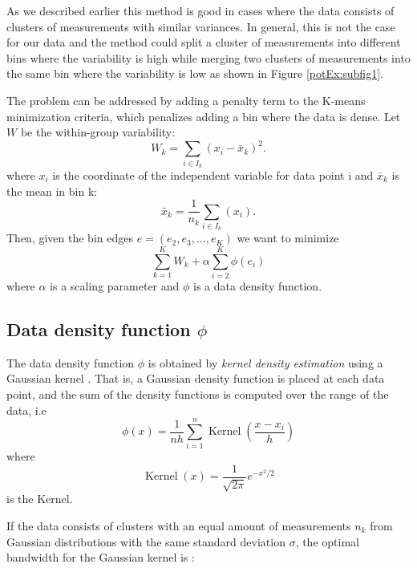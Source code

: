 As we described earlier this method is good in cases where the data consists of clusters of measurements with similar variances. In general, this is not the case for our data and the method could split a cluster of measurements into different bins where the variability is high while merging two clusters of measurements into the same bin where the variability is low as shown in Figure \ref{potEx:subfig1}.
\par

The problem can be addressed by adding a penalty term to the K-means minimization criteria, which penalizes adding a bin where the data is dense. Let $W$ be the within-group variability:
\begin{equation}
	W_k = \sum_{i \in I_k} (x_i - \bar{x}_k)^2.
\end{equation}
where $x_i$ is the coordinate of the independent variable for data point i and $\bar{x}_k$ is the mean in bin k:
\begin{equation}
	\bar{x}_k = \frac{1}{n_k}\sum_{i \in I_k} (x_i).
\end{equation}
 Then, given the bin edges $e = (e_2, e_3, ..., e_K)$ we want to minimize
\begin{equation}
	\sum_{k=1}^K W_k + \alpha \sum_{i=2}^K \phi (e_i)
	\label{eq:objectiveFunction1}
\end{equation}
where $\alpha$ is a scaling parameter and $\phi$ is a data density function.


\subsection{Data density function $\phi$}
The data density function $\phi$ is obtained by {\em kernel density estimation} using a Gaussian kernel \cite{GaussianKernel}. That is, a Gaussian density function is placed at each data point, and the sum of the density functions is computed over the range of the data, i.e
\begin{equation}
	\phi(x) = \frac{1}{nh} \sum_{i=1}^n \operatorname{Kernel} \left ( \frac{x - x_i}{h} \right )
\end{equation}
where
\begin{equation}
	\operatorname{Kernel}(x) = \frac{1}{\sqrt{2\pi}}e^{-x^2/2}
\end{equation}
is the Kernel.

If the data consists of clusters with an equal amount of measurements $n_k$ from Gaussian distributions with the same standard deviation $\sigma$, the optimal bandwidth for the Gaussian kernel is \cite{GaussianKernel}:

